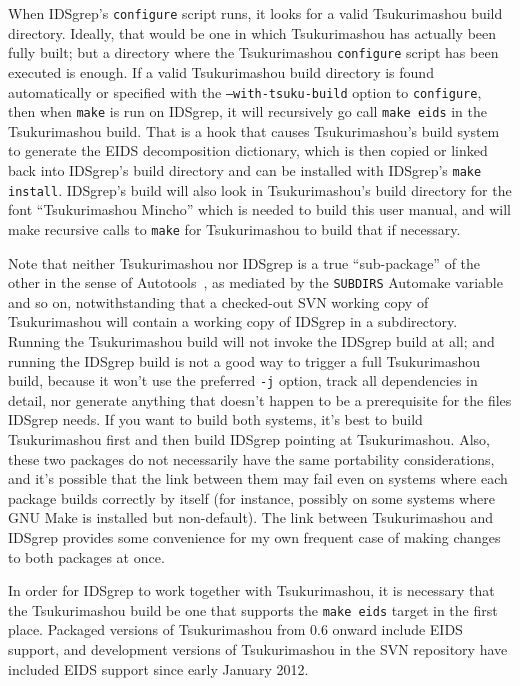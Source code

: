 \documentclass[twocolumn]{report}
\begin{document}
When IDSgrep's \texttt{configure} script runs, it looks for a valid
Tsukurimashou build directory.  Ideally, that would be one in which
Tsukurimashou has actually been fully built; but a directory where the
Tsukurimashou \texttt{configure} script has been executed is enough.  If a
valid Tsukurimashou build directory is found automatically or specified with
the \texttt{--with-tsuku-build} option to \texttt{configure}, then when
\texttt{make} is run on IDSgrep, it will recursively go call \texttt{make
eids} in the Tsukurimashou build.  That is a hook that causes
Tsukurimashou's build system to generate the EIDS decomposition dictionary,
which is then copied or linked back into IDSgrep's build directory and can
be installed with IDSgrep's \texttt{make install}.  IDSgrep's build will
also look in Tsukurimashou's build directory for the font ``Tsukurimashou
Mincho'' which is needed to build this user manual, and will make
recursive calls to \texttt{make} for Tsukurimashou to build that if
necessary.

Note that neither Tsukurimashou nor IDSgrep is a true ``sub-package'' of the
other in the sense of Autotools~\cite{Autotools}, as mediated by the
\texttt{SUBDIRS} Automake variable and so on, notwithstanding that a
checked-out SVN working copy of Tsukurimashou will contain a working copy of
IDSgrep in a subdirectory.  Running the Tsukurimashou build will not invoke
the IDSgrep build at all; and running the IDSgrep build is not a good way to
trigger a full Tsukurimashou build, because it won't use the preferred
\texttt{-j} option, track all dependencies in detail, nor generate anything
that doesn't happen to be a prerequisite for the files IDSgrep needs.  If
you want to build both systems, it's best to build Tsukurimashou first and
then build IDSgrep pointing at Tsukurimashou.  Also, these two packages do
not necessarily have the same portability considerations, and it's possible
that the link between them may fail even on systems where each package
builds correctly by itself (for instance, possibly on some systems where GNU
Make is installed but non-default).  The link between Tsukurimashou and
IDSgrep provides some convenience for my own frequent case of making changes
to both packages at once.

In order for IDSgrep to work together with Tsukurimashou, it is necessary
that the Tsukurimashou build be one that supports the \texttt{make eids}
target in the first place.  Packaged versions of Tsukurimashou from 0.6
onward include EIDS support, and development versions of Tsukurimashou in
the SVN repository have included EIDS support since early January 2012.
\end{document}
